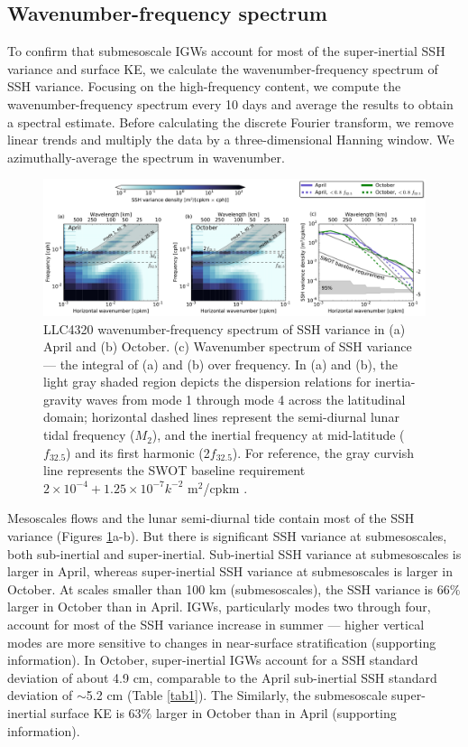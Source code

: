 \documentclass[grl]{agutex2015}
\begin{document}
\begin{article}
\section{Wavenumber-frequency spectrum}
To confirm that submesoscale IGWs account for most of the super-inertial SSH variance
and surface KE, we calculate the wavenumber-frequency spectrum of SSH variance. Focusing on
the high-frequency
content, we compute the wavenumber-frequency spectrum  every 10 days and average
the results to obtain a spectral estimate. Before calculating the discrete Fourier
transform, we
remove linear trends and multiply the data by a three-dimensional Hanning window.
We azimuthally-average the spectrum in wavenumber.

\begin{figure}[ht]
  \begin{center}
    \includegraphics[width=.9\textwidth]{figs/fig4.pdf}
 \caption{\small LLC4320 wavenumber-frequency spectrum of SSH variance in (a) April and (b) October.
          (c) Wavenumber spectrum of SSH variance --- the integral of (a) and (b) over frequency.
          In (a) and (b), the light gray shaded region depicts the dispersion relations for inertia-gravity
          waves from mode 1 through mode 4 across the latitudinal domain; horizontal dashed lines represent the semi-diurnal
          lunar tidal frequency ($M_2$), and the inertial frequency at mid-latitude
          ($f_{32.5}$) and its first harmonic (2$f_{32.5}$). For reference, the gray curvish line represents
          the SWOT baseline requirement $2\times 10^{-4} + 1.25\times 10^{-7} k^{-2}$ m$^2$/cpkm \citep{rodriguez2012}.
          }
  \label{fig4}
 \end{center}
\end{figure}

Mesoscales flows and the lunar semi-diurnal tide contain most of the
SSH variance (Figures \ref{fig4}a-b). But there is significant SSH variance at
submesoscales, both sub-inertial
and super-inertial. Sub-inertial SSH variance at submesoscales is larger in April, whereas
super-inertial SSH variance at submesoscales is larger in October. At scales smaller
than 100 km (submesoscales), the SSH variance is 66$\%$ larger in October than in April.
IGWs, particularly modes two through four, account for most of the SSH variance
increase in summer --- higher vertical
modes are more sensitive to changes in near-surface stratification (supporting information).
In October, super-inertial IGWs account for a SSH standard deviation of about 4.9 cm,
comparable to the April sub-inertial SSH standard deviation of $\sim$5.2 cm (Table \ref{tab1}).
The
Similarly, the submesoscale super-inertial surface KE is 63$\%$ larger in October
than in April (supporting information).


\end{article}
\end{document}
